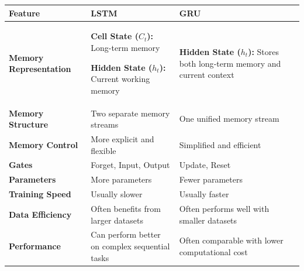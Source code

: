 \documentclass[11pt]{article}
\begin{document}
\vspace{0.15in}

{
\small
\renewcommand{\arraystretch}{1.2}
\begin{center}
\begin{tabular}{@{}p{\dimexpr(\textwidth-24pt)/3\relax}
                p{\dimexpr(\textwidth-24pt)/3\relax}
                p{\dimexpr(\textwidth-24pt)/3\relax}@{}}
\toprule
\rowcolor{brandlight}
\textbf{Feature} &
\color{brandblue}\textbf{LSTM} &
\color{brandorange}\textbf{GRU} \\
\midrule

\textbf{Memory Representation} &
\textbf{Cell State ($C_t$):} Long-term memory

\textbf{Hidden State ($h_t$):} Current working memory &
\textbf{Hidden State ($h_t$):}
Stores both long‑term memory and current context \\

\textbf{Memory Structure} &
Two separate memory streams &
One unified memory stream \\

\textbf{Memory Control} &
More explicit and flexible &
Simplified and efficient \\

\textbf{Gates} &
Forget, Input, Output &
Update, Reset \\

\textbf{Parameters} &
More parameters &
Fewer parameters \\

\textbf{Training Speed} &
Usually slower &
Usually faster \\

\textbf{Data Efficiency} &
Often benefits from larger datasets &
Often performs well with smaller datasets \\

\textbf{Performance} &
Can perform better on complex sequential tasks &
Often comparable with lower computational cost \\

\bottomrule
\end{tabular}
\end{center}
}

\vspace{0.1in}
\end{document}
